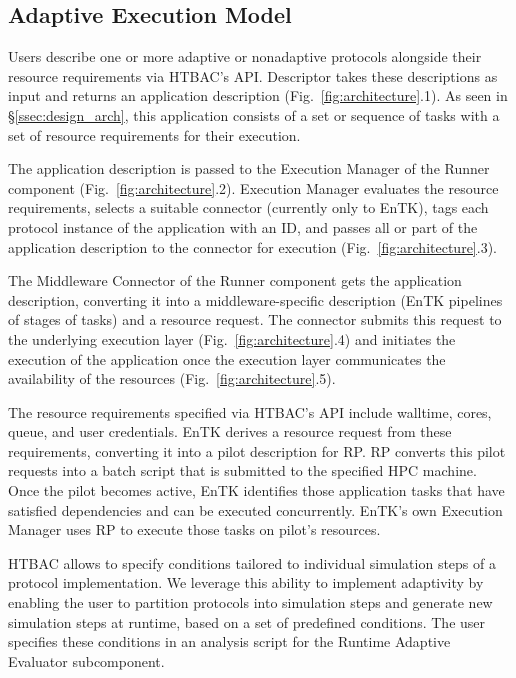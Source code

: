 \subsection{Adaptive Execution Model}\label{ssec:adaptive_execution}

Users describe one or more adaptive or nonadaptive protocols alongside their
resource requirements via HTBAC's API. Descriptor takes these descriptions as
input and returns an application description (Fig.~\ref{fig:architecture}.1).
As seen in \S\ref{ssec:design_arch}, this application consists of a set or
sequence of tasks with a set of resource requirements for their execution.

The application description is passed to the Execution Manager of the Runner
component (Fig.~\ref{fig:architecture}.2). Execution Manager evaluates the
resource requirements, selects a suitable connector (currently only to EnTK),
tags each protocol instance of the application with an ID, and passes all or
part of the application description to the connector for execution
(Fig.~\ref{fig:architecture}.3).

The Middleware Connector of the Runner component gets the application
description, converting it into a middleware-specific description (EnTK
pipelines of stages of tasks) and a resource request. The connector submits
this request to the underlying execution layer
(Fig.~\ref{fig:architecture}.4) and initiates the execution of the
application once the execution layer communicates the availability of the
resources (Fig.~\ref{fig:architecture}.5).

The resource requirements specified via HTBAC's API include walltime, cores,
queue, and user credentials. EnTK derives a resource request from these
requirements, converting it into a pilot description for RP. RP converts this
pilot requests into a batch script that is submitted to the specified HPC
machine. Once the pilot becomes active, EnTK identifies those application
tasks that have satisfied dependencies and can be executed concurrently.
EnTK's own Execution Manager uses RP to execute those tasks on pilot's
resources.

HTBAC allows to specify conditions tailored to individual simulation steps of
a protocol implementation. We leverage this ability to implement adaptivity
by enabling the user to partition protocols into simulation steps and
generate new simulation steps at runtime, based on a set of predefined
conditions. The user specifies these conditions in an analysis script for the
Runtime Adaptive Evaluator subcomponent.

